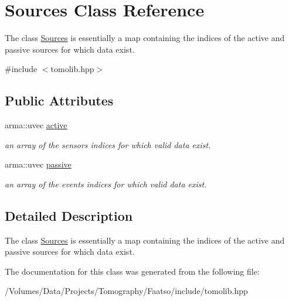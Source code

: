 \hypertarget{class_sources}{}\section{Sources Class Reference}
\label{class_sources}


The class \hyperlink{class_sources}{Sources} is essentially a map containing the indices of the active and passive sources for which data exist.  




{\ttfamily \#include $<$tomolib.\+hpp$>$}

\subsection*{Public Attributes}
\begin{DoxyCompactItemize}
\item 
\hypertarget{class_sources_af990adc8af8e3b67f37cf211758a4c07}{}arma\+::uvec \hyperlink{class_sources_af990adc8af8e3b67f37cf211758a4c07}{active}\label{class_sources_af990adc8af8e3b67f37cf211758a4c07}

\begin{DoxyCompactList}\small\item\em an array of the sensors indices for which valid data exist. \end{DoxyCompactList}\item 
\hypertarget{class_sources_a9e9d18baf071e3de6d1ea1d58b8bb455}{}arma\+::uvec \hyperlink{class_sources_a9e9d18baf071e3de6d1ea1d58b8bb455}{passive}\label{class_sources_a9e9d18baf071e3de6d1ea1d58b8bb455}

\begin{DoxyCompactList}\small\item\em an array of the events indices for which valid data exist. \end{DoxyCompactList}\end{DoxyCompactItemize}


\subsection{Detailed Description}
The class \hyperlink{class_sources}{Sources} is essentially a map containing the indices of the active and passive sources for which data exist. 

The documentation for this class was generated from the following file\+:\begin{DoxyCompactItemize}
\item 
/\+Volumes/\+Data/\+Projects/\+Tomography/\+Faatso/include/tomolib.\+hpp\end{DoxyCompactItemize}
